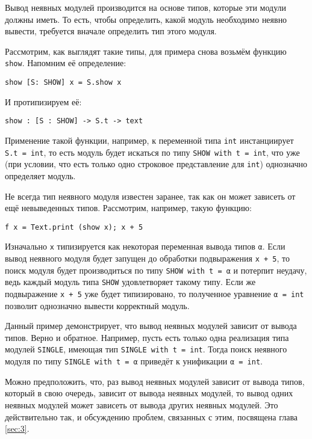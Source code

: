 \documentclass[../diploma.tex]{subfiles}
\begin{document}
Вывод неявных модулей производится на основе типов, которые эти модули должны иметь. То есть, чтобы определить, какой модуль необходимо неявно вывести, требуется вначале определить тип этого модуля. 

Рассмотрим, как выглядят такие типы, для примера снова возьмём функцию \texttt{show}. Напомним её определение:

\begin{verbatim}
show [S: SHOW] x = S.show x
\end{verbatim}

И протипизируем её:

\begin{verbatim}
show : [S : SHOW] -> S.t -> text
\end{verbatim}

Применение такой функции, например, к переменной типа \texttt{int} инстанциирует \\\texttt{S.t = int}, то есть модуль будет искаться по типу \texttt{SHOW with t = int}, что уже (при условии, что есть только одно строковое представление для \texttt{int}) однозначно определяет модуль.

Не всегда тип неявного модуля известен заранее, так как он может зависеть от ещё невыведенных типов. Рассмотрим, например, такую функцию:

\begin{verbatim}
f x = Text.print (show x); x + 5
\end{verbatim}

Изначально \texttt{x} типизируется как некоторая переменная вывода типов \texttt{α}. Если вывод неявного модуля будет запущен до обработки подвыражения \texttt{x + 5}, то поиск модуля будет производиться по типу \texttt{SHOW with t = α} и потерпит неудачу, ведь каждый модуль типа \texttt{SHOW} удовлетворяет такому типу. Если же подвыражение \texttt{x + 5} уже будет типизировано, то полученное уравнение \texttt{α = int} позволит однозначно вывести корректный модуль.

Данный пример демонстрирует, что вывод неявных модулей зависит от вывода типов. Верно и обратное. Например, пусть есть только одна реализация типа модулей \texttt{SINGLE}, имеющая тип \texttt{SINGLE with t = int}. Тогда поиск неявного модуля по типу \texttt{SINGLE with t = α} приведёт к унификации \texttt{α = int}.

Можно предположить, что, раз вывод неявных модулей зависит от вывода типов, который в свою очередь, зависит от вывода неявных модулей, то вывод одних неявных модулей может зависеть от вывода других неявных модулей. Это действительно так, и обсуждению проблем, связанных с этим, посвящена глава \ref{sec:3}.
\end{document}
